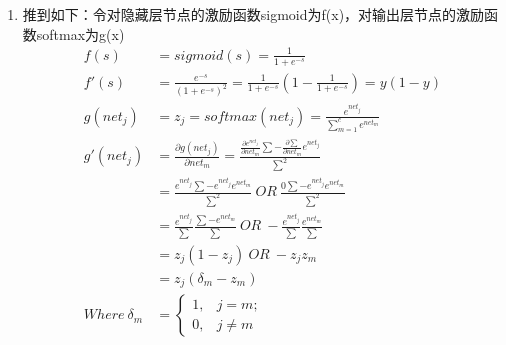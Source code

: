 \documentclass[a4paper,11pt,onecolumn,oneside,UTF8]{article}
\begin{document}
\begin{enumerate}
    \item
          推到如下：令对隐藏层节点的激励函数sigmoid为f(x)，对输出层节点的激励函数softmax为g(x)
          $$
              \begin{aligned}
                  f\left(s\right)      & =sigmoid\left(s\right)=\frac{1}{1+e^{-s}}                                                                                                                        \\
                  f'\left(s\right)     & =\frac{e^{-s}}{\left(1+e^{-s}\right)^2}=\frac{1}{1+e^{-s}}\left(1-\frac{1}{1+e^{-s}}\right)=y\left(1-y\right)                                                    \\
                  g\left(net_j\right)  & =z_j=softmax\left(net_j\right)=\frac{e^{net_j}}{\sum\limits_{m=1}^ce^{net_m}}                                                                                    \\
                  g'\left(net_j\right) & =\frac{\partial g\left(net_j\right)}{\partial net_m} =\frac{\frac{\partial e^{net_j}}{\partial net_m}\sum-\frac{\partial \sum}{\partial net_m}e^{net_j}}{\sum^2} \\
                                       & =\frac{e^{net_j}\sum-e^{net_j}e^{net_m}}{\sum^2}\ OR\ \frac{0\sum-e^{net_j}e^{net_m}}{\sum^2}                                                                    \\
                                       & =\frac{e^{net_j}}{\sum}\frac{\sum-e^{net_m}}{\sum}\ OR\ -\frac{e^{net_j}}{\sum}\frac{e^{net_m}}{\sum}                                                            \\
                                       & =z_j\left(1-z_j\right)\ OR\ -z_jz_m                                                                                                                              \\
                                       & = z_j\left(\delta_m-z_m\right)                                                                                                                                   \\
                  Where\ \delta_m      & = \left\{\begin{array}{ll}
                      1, & j=m;    \\
                      0, & j\neq m
                  \end{array}
                  \right.                                                                                                                                                                                 \\

\end{aligned}$$
\end{enumerate}
\end{document}
